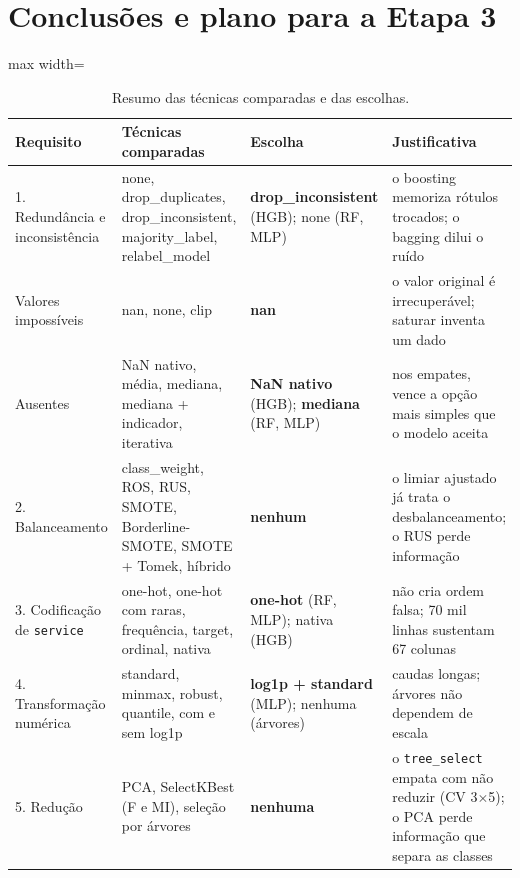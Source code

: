 \documentclass[11pt,a4paper]{article}
\begin{document}
\section{Conclusões e plano para a Etapa 3}

\begin{table}[H]
\centering
\caption{Resumo das técnicas comparadas e das escolhas.}
\begin{adjustbox}{max width=\linewidth}
\begin{tabular}{p{3.2cm}p{4.6cm}p{3.6cm}p{5.2cm}}
\toprule
Requisito & Técnicas comparadas & Escolha & Justificativa \\
\midrule
1. Redundância e inconsistência & none, drop\_duplicates, drop\_inconsistent, majority\_label, relabel\_model & \textbf{drop\_inconsistent} (HGB); none (RF, MLP) & o boosting memoriza rótulos trocados; o bagging dilui o ruído \\
Valores impossíveis & nan, none, clip & \textbf{nan} & o valor original é irrecuperável; saturar inventa um dado \\
Ausentes & NaN nativo, média, mediana, mediana + indicador, iterativa & \textbf{NaN nativo} (HGB); \textbf{mediana} (RF, MLP) & nos empates, vence a opção mais simples que o modelo aceita \\
2. Balanceamento & class\_weight, ROS, RUS, SMOTE, Borderline-SMOTE, SMOTE + Tomek, híbrido & \textbf{nenhum} & o limiar ajustado já trata o desbalanceamento; o RUS perde informação \\
3. Codificação de \texttt{service} & one-hot, one-hot com raras, frequência, target, ordinal, nativa & \textbf{one-hot} (RF, MLP); nativa (HGB) & não cria ordem falsa; 70 mil linhas sustentam 67 colunas \\
4. Transformação numérica & standard, minmax, robust, quantile, com e sem log1p & \textbf{log1p + standard} (MLP); nenhuma (árvores) & caudas longas; árvores não dependem de escala \\
5. Redução & PCA, SelectKBest (F e MI), seleção por árvores & \textbf{nenhuma} & o \texttt{tree\_select} empata com não reduzir (CV 3$\times$5); o PCA perde informação que separa as classes \\
\bottomrule
\end{tabular}
\end{adjustbox}
\end{table}
\end{document}
